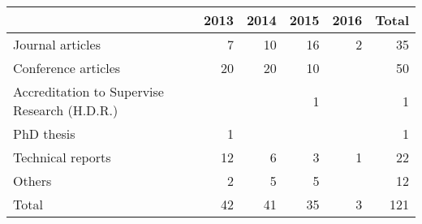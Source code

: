 \begin{center}\begin{tabular}{lrrrrr}\hline
  & 2013 & 2014 & 2015 & 2016 & Total \\\hline
  Journal articles &7 & 10 & 16 & 2 & 35 \\
  Conference articles &20 & 20 & 10 &  & 50 \\
  Accreditation to Supervise Research (H.D.R.) & &  & 1 &  & 1 \\
  PhD thesis &1 &  &  &  & 1 \\
  Technical reports &12 & 6 & 3 & 1 & 22 \\
  Others &2 & 5 & 5 &  & 12 \\
\hline
 Total & 42 &  41 &  35 &  3 & 121 \\\hline
\end{tabular}\end{center}
